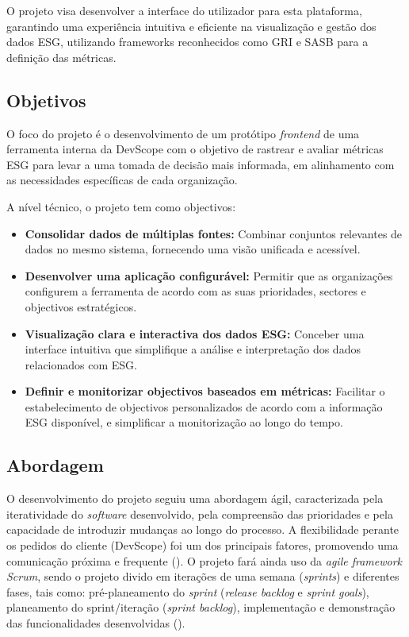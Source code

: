 O projeto visa desenvolver a interface do utilizador para esta plataforma, garantindo uma experiência intuitiva e eficiente na visualização e gestão dos dados ESG, utilizando frameworks reconhecidos como GRI e SASB para a definição das métricas.


\subsection{Objetivos}

O foco do projeto é o desenvolvimento de um protótipo \textit{frontend} de uma ferramenta interna da DevScope com o objetivo de rastrear e avaliar métricas ESG para levar a uma tomada de decisão mais informada, em alinhamento com as necessidades específicas de cada organização.

A nível técnico, o projeto tem como objectivos:

\begin{itemize}
\item \textbf{Consolidar dados de múltiplas fontes:} Combinar conjuntos relevantes de dados no mesmo sistema, fornecendo uma visão unificada e acessível.
\item \textbf{Desenvolver uma aplicação configurável:} Permitir que as organizações configurem a ferramenta de acordo com as suas prioridades, sectores e objectivos estratégicos.
\item \textbf{Visualização clara e interactiva dos dados ESG:} Conceber uma interface intuitiva que simplifique a análise e interpretação dos dados relacionados com ESG.
\item \textbf{Definir e monitorizar objectivos baseados em métricas:} Facilitar o estabelecimento de objectivos personalizados de acordo com a informação ESG disponível, e simplificar a monitorização ao longo do tempo.
\end{itemize}

\subsection{Abordagem} 

O desenvolvimento do projeto seguiu uma abordagem ágil, caracterizada pela iteratividade do \textit{software} desenvolvido, pela compreensão das prioridades e pela capacidade de introduzir mudanças ao longo do processo. A flexibilidade perante os pedidos do cliente (DevScope) foi um dos principais fatores, promovendo uma comunicação próxima e frequente (\cite{Patel2025}). O projeto fará ainda uso da \textit{agile framework Scrum}, sendo o projeto divido em iterações de uma semana (\textit{sprints}) e diferentes fases, tais como: pré-planeamento do \textit{sprint} (\textit{release backlog} e \textit{sprint goals}), planeamento do sprint/iteração (\textit{sprint backlog}), implementação e demonstração das funcionalidades desenvolvidas (\cite{Cohen2004}).


